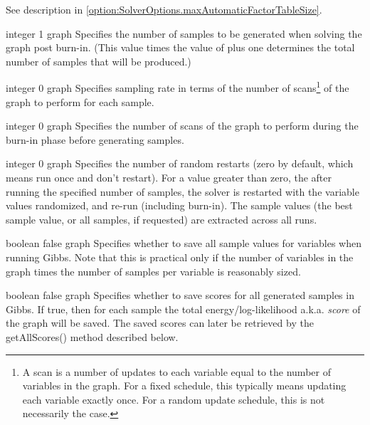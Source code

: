 
See description in \autoref{option:SolverOptions.maxAutomaticFactorTableSize}.


{integer}
{1}
{graph}
{Specifies the number of samples to be generated when solving the graph post burn-in.  (This value times the value of  plus one determines the total number of samples that will be produced.)}


{integer}
{0}
{graph}
{Specifies sampling rate in terms of the number of scans\footnote{A scan is a number of updates to each variable equal to the number of variables in the graph.  For a fixed schedule, this typically means updating each variable exactly once.  For a random update schedule, this is not necessarily the case.} of the graph to perform for each sample.}



{integer}
{0}
{graph}
{Specifies the number of scans of the graph to perform during the burn-in phase before generating samples.}


{integer}
{0}
{graph}
{Specifies the number of random restarts (zero by default, which means run once and don't restart). For a value greater than zero, the after running the specified number of samples, the solver is restarted with the variable values randomized, and re-run (including burn-in).  The sample values (the best sample value, or all samples, if requested) are extracted across all runs.
}


{boolean}
{false}
{graph}
{Specifies whether to save all sample values for variables when running Gibbs. Note that this is practical only if the number of variables in the graph times the number of samples per variable is reasonably sized.}


{boolean}
{false}
{graph}
{Specifies whether to save scores for all generated samples in Gibbs. If true, then for each sample the total energy/log-likelihood a.k.a. \emph{score} of the graph will be saved. The saved scores can later be retrieved by the getAllScores() method described below.}

